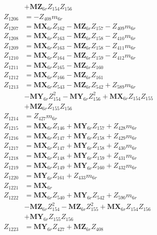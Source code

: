 \begin{multicols}{2}
\begin{align}
&+ \mathbf{MZ}_{6r}Z_{154}Z_{156} \nonumber \\
Z_{1206} &= -Z_{408}m_{6r} \nonumber \\
Z_{1207} &= \mathbf{MX}_{6r}Z_{162} - \mathbf{MZ}_{6r}Z_{157} - Z_{409}m_{6r} \nonumber \\
Z_{1208} &= \mathbf{MX}_{6r}Z_{163} - \mathbf{MZ}_{6r}Z_{158} - Z_{410}m_{6r} \nonumber \\
Z_{1209} &= \mathbf{MX}_{6r}Z_{163} - \mathbf{MZ}_{6r}Z_{158} - Z_{411}m_{6r} \nonumber \\
Z_{1210} &= \mathbf{MX}_{6r}Z_{164} - \mathbf{MZ}_{6r}Z_{159} - Z_{412}m_{6r} \nonumber \\
Z_{1211} &= \mathbf{MX}_{6r}Z_{165} - \mathbf{MZ}_{6r}Z_{160} \nonumber \\
Z_{1212} &= \mathbf{MX}_{6r}Z_{166} - \mathbf{MZ}_{6r}Z_{161} \nonumber \\
Z_{1213} &= \mathbf{MX}_{6r}Z_{543} - \mathbf{MZ}_{6r}Z_{542} + Z_{589}m_{6r}  \nonumber \\
&- \mathbf{MY}_{6r}Z_{154}^2 - \mathbf{MY}_{6r}Z_{156}^2 + \mathbf{MX}_{6r}Z_{154}Z_{155}  \nonumber \\
&+ \mathbf{MZ}_{6r}Z_{155}Z_{156} \nonumber \\
Z_{1214} &= Z_{427}m_{6r} \nonumber \\
Z_{1215} &= \mathbf{MX}_{6r}Z_{146} + \mathbf{MY}_{6r}Z_{157} + Z_{428}m_{6r} \nonumber \\
Z_{1216} &= \mathbf{MX}_{6r}Z_{147} + \mathbf{MY}_{6r}Z_{158} + Z_{429}m_{6r} \nonumber \\
Z_{1217} &= \mathbf{MX}_{6r}Z_{147} + \mathbf{MY}_{6r}Z_{158} + Z_{430}m_{6r} \nonumber \\
Z_{1218} &= \mathbf{MX}_{6r}Z_{148} + \mathbf{MY}_{6r}Z_{159} + Z_{431}m_{6r} \nonumber \\
Z_{1219} &= \mathbf{MX}_{6r}Z_{149} + \mathbf{MY}_{6r}Z_{160} + Z_{432}m_{6r} \nonumber \\
Z_{1220} &= \mathbf{MY}_{6r}Z_{161} + Z_{433}m_{6r} \nonumber \\
Z_{1221} &= \mathbf{MX}_{6r} \nonumber \\
Z_{1222} &= \mathbf{MX}_{6r}Z_{540} + \mathbf{MY}_{6r}Z_{542} + Z_{590}m_{6r}  \nonumber \\
&- \mathbf{MZ}_{6r}Z_{154}^2 - \mathbf{MZ}_{6r}Z_{155}^2 + \mathbf{MX}_{6r}Z_{154}Z_{156}  \nonumber \\
&+ \mathbf{MY}_{6r}Z_{155}Z_{156} \nonumber \\
Z_{1223} &= \mathbf{MY}_{6r}Z_{427} + \mathbf{MZ}_{6r}Z_{408} \nonumber \\

\end{align}
\end{multicols}
